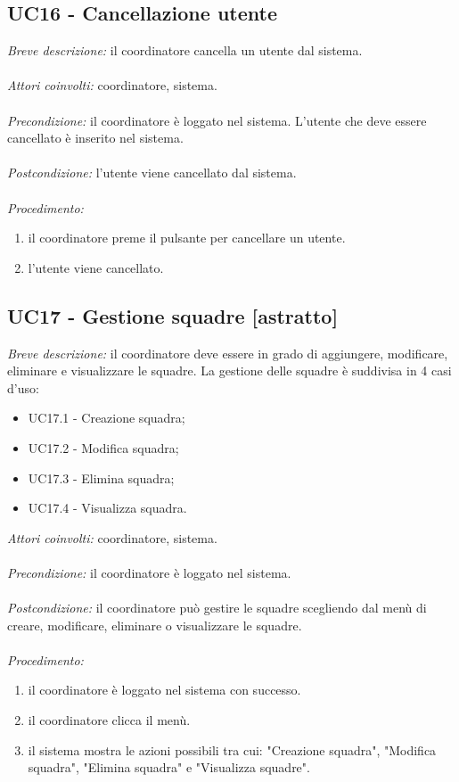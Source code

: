 \subsection{UC16 - Cancellazione utente}
\textit{Breve descrizione:} il coordinatore cancella un utente dal sistema. 
\\
\\
\textit{Attori coinvolti:} coordinatore, sistema.
\\
\\
\textit{Precondizione:} il coordinatore è loggato nel sistema.
L'utente che deve essere cancellato è inserito nel sistema.
\\
\\
\textit{Postcondizione:} l'utente viene cancellato dal sistema.
\\
\\
\textit{Procedimento:}
\begin{enumerate}
	\item il coordinatore preme il pulsante per cancellare un utente.
	\item l'utente viene cancellato.
\end{enumerate}

\subsection{UC17 - Gestione squadre [astratto]}
\textit{Breve descrizione:} il coordinatore deve essere in grado di aggiungere, modificare, eliminare e visualizzare le squadre. La gestione delle squadre è suddivisa in 4 casi d'uso:
\begin{itemize}
	\item UC17.1 - Creazione squadra;
	\item UC17.2 - Modifica squadra;
	\item UC17.3 - Elimina squadra;
	\item UC17.4 - Visualizza squadra.
\end{itemize}

\textit{Attori coinvolti:} coordinatore, sistema.
\\
\\
\textit{Precondizione:} il coordinatore è loggato nel sistema.
\\
\\
\textit{Postcondizione:} il coordinatore può gestire le squadre scegliendo dal menù di creare, modificare, eliminare o visualizzare le squadre.
\\
\\
\textit{Procedimento:}
\begin{enumerate}
	\item il coordinatore è loggato nel sistema con successo.
	\item il coordinatore clicca il menù.
	\item il sistema mostra le azioni possibili tra cui: "Creazione squadra", "Modifica squadra", "Elimina squadra" e "Visualizza squadre".
\end{enumerate}